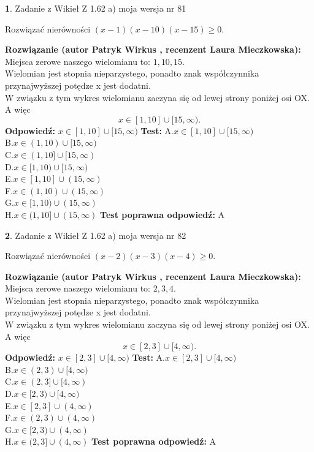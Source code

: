 \documentclass[12pt, a4paper]{article}
\theoremstyle{definition} %
\newtheorem{zad}{}
\newcommand{\zadStart}[1]{\begin{zad}#1\newline}
\newcommand{\zadStop}{\end{zad}}
\newcommand{\rozwStart}[2]{\noindent \textbf{Rozwiązanie (autor #1 , recenzent #2): }\newline}
\newcommand{\rozwStop}{\newline}
\newcommand{\odpStart}{\noindent \textbf{Odpowiedź:}\newline}
\newcommand{\odpStop}{\newline}
\newcommand{\testStart}{\noindent \textbf{Test:}\newline}
\newcommand{\testStop}{\newline}
\newcommand{\kluczStart}{\noindent \textbf{Test poprawna odpowiedź:}\newline}
\newcommand{\kluczStop}{\newline}
\begin{document}
\zadStart{Zadanie z Wikieł Z 1.62 a) moja wersja nr 81}

Rozwiązać nierówności $(x-1)(x-10)(x-15)\ge0$.
\zadStop
\rozwStart{Patryk Wirkus}{Laura Mieczkowska}
Miejsca zerowe naszego wielomianu to: $1, 10, 15$.\\
Wielomian jest stopnia nieparzystego, ponadto znak współczynnika przy\linebreak najwyższej potędze x jest dodatni.\\ W związku z tym wykres wielomianu zaczyna się od lewej strony poniżej osi OX. A więc $$x \in [1,10] \cup [15,\infty).$$
\rozwStop
\odpStart
$x \in [1,10] \cup [15,\infty)$
\odpStop
\testStart
A.$x \in [1,10] \cup [15,\infty)$\\
B.$x \in (1,10) \cup [15,\infty)$\\
C.$x \in (1,10] \cup [15,\infty)$\\
D.$x \in [1,10) \cup [15,\infty)$\\
E.$x \in [1,10] \cup (15,\infty)$\\
F.$x \in (1,10) \cup (15,\infty)$\\
G.$x \in [1,10) \cup (15,\infty)$\\
H.$x \in (1,10] \cup (15,\infty)$
\testStop
\kluczStart
A
\kluczStop



\zadStart{Zadanie z Wikieł Z 1.62 a) moja wersja nr 82}

Rozwiązać nierówności $(x-2)(x-3)(x-4)\ge0$.
\zadStop
\rozwStart{Patryk Wirkus}{Laura Mieczkowska}
Miejsca zerowe naszego wielomianu to: $2, 3, 4$.\\
Wielomian jest stopnia nieparzystego, ponadto znak współczynnika przy\linebreak najwyższej potędze x jest dodatni.\\ W związku z tym wykres wielomianu zaczyna się od lewej strony poniżej osi OX. A więc $$x \in [2,3] \cup [4,\infty).$$
\rozwStop
\odpStart
$x \in [2,3] \cup [4,\infty)$
\odpStop
\testStart
A.$x \in [2,3] \cup [4,\infty)$\\
B.$x \in (2,3) \cup [4,\infty)$\\
C.$x \in (2,3] \cup [4,\infty)$\\
D.$x \in [2,3) \cup [4,\infty)$\\
E.$x \in [2,3] \cup (4,\infty)$\\
F.$x \in (2,3) \cup (4,\infty)$\\
G.$x \in [2,3) \cup (4,\infty)$\\
H.$x \in (2,3] \cup (4,\infty)$
\testStop
\kluczStart
A
\kluczStop
\end{document}
